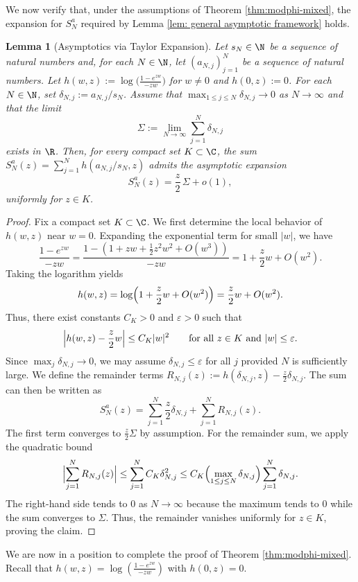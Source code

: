 \documentclass[11pt,a4paper]{scrartcl}
\numberwithin{equation}{section}
\theoremstyle{plain}
\newtheorem{lemma}{Lemma}[section]
\theoremstyle{definition}
\theoremstyle{remark}
\begin{document}
We now verify that, under the assumptions of Theorem \ref{thm:modphi-mixed}, the expansion for $S_N^a$ required by Lemma \ref{lem: general asymptotic framework} holds.

\begin{lemma}[Asymptotics via Taylor Expansion]\label{lem: asymptotics Taylor}
Let $s_N \in \N$ be a sequence of natural numbers and, for each $N\in\N$, let $(a_{N,j})_{j=1}^N$ be a sequence of natural numbers. Let $h(w, z) := \log\bigl(\frac{1-e^{zw}}{-zw}\bigr)$ for $w \neq 0$ and $h(0, z):=0$. For each $N \in \N$, set $\delta_{N,j} := a_{N,j}/s_N$. Assume that $\max_{1\le j \le N} \delta_{N,j} \to 0$ as $N\to\infty$ and that the limit
\[
\Sigma := \lim_{N\to\infty} \sum_{j=1}^N \delta_{N,j}
\]
exists in $\R$. Then, for every compact set $K\subset\C$, the sum $S_N^a(z) = \sum_{j=1}^N h(a_{N,j}/s_N, z)$ admits the asymptotic expansion
\[
S_N^a(z) = \frac{z}{2}\,\Sigma + o(1),
\]
uniformly for $z\in K$.
\end{lemma}
\begin{proof}
Fix a compact set $K\subset\C$. We first determine the local behavior of $h(w,z)$ near $w=0$. Expanding the exponential term for small $|w|$, we have
\[
\frac{1-e^{zw}}{-zw} = \frac{1 - (1 + zw + \frac{1}{2}z^2w^2 + O(w^3))}{-zw} = 1 + \frac{z}{2}w + O(w^2).
\]
Taking the logarithm yields
\[
h(w,z) = \log\Bigl(1 + \frac{z}{2}w + O(w^2)\Bigr) = \frac{z}{2}w + O(w^2).
\]
Thus, there exist constants $C_K>0$ and $\varepsilon>0$ such that
\[
\Bigl|h(w,z) - \frac{z}{2}w\Bigr| \le C_K |w|^2 \qquad\text{for all }z\in K\text{ and }|w|\le\varepsilon.
\]
Since $\max_j \delta_{N,j} \to 0$, we may assume $\delta_{N,j} \le \varepsilon$ for all $j$ provided $N$ is sufficiently large. We define the remainder terms $R_{N,j}(z) := h(\delta_{N,j},z) - \frac{z}{2}\delta_{N,j}$. The sum can then be written as
\[
S_N^a(z) = \sum_{j=1}^N \frac{z}{2}\delta_{N,j} + \sum_{j=1}^N R_{N,j}(z).
\]
The first term converges to $\frac{z}{2}\Sigma$ by assumption. For the remainder sum, we apply the quadratic bound
\[
\Bigl|\sum_{j=1}^N R_{N,j}(z)\Bigr| \le \sum_{j=1}^N C_K \delta_{N,j}^2 \le C_K \Bigl(\max_{1\le j\le N}\delta_{N,j}\Bigr)\sum_{j=1}^N \delta_{N,j}.
\]
The right-hand side tends to $0$ as $N\to\infty$ because the maximum tends to $0$ while the sum converges to $\Sigma$. Thus, the remainder vanishes uniformly for $z\in K$, proving the claim.
\end{proof}

We are now in a position to complete the proof of Theorem \ref{thm:modphi-mixed}. Recall that $h(w,z)=\log(\frac{1-e^{zw}}{-zw})$ with $h(0,z)=0$.
\end{document}
